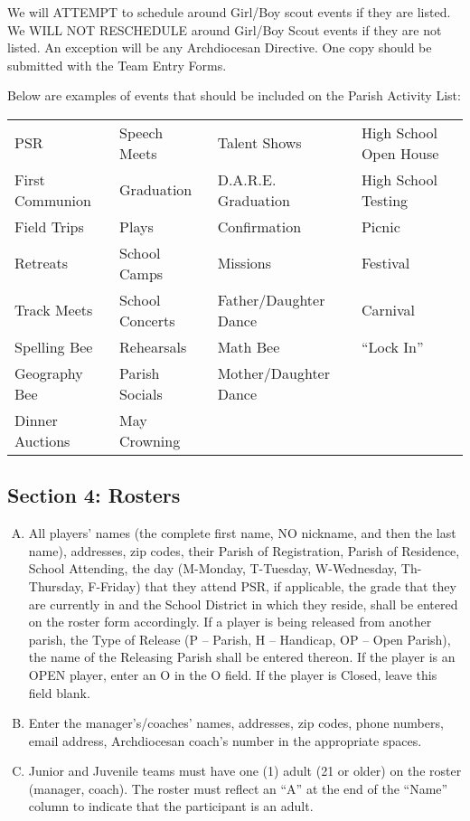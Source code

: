 We will ATTEMPT to schedule around Girl/Boy scout events if they are listed.  We WILL NOT RESCHEDULE around Girl/Boy Scout events if they are not listed.  An exception will be any Archdiocesan Directive. 
One copy should be submitted with the Team Entry Forms.

Below are examples of events that should be included on the Parish Activity List:

\begin{center}
    \begin{tabular}{>{\small}l >{\small}l >{\small}l >{\small}l}
        PSR & Speech Meets & Talent Shows & High School Open House \\
        First Communion & Graduation & D.A.R.E. Graduation & High School Testing \\
        Field Trips	& Plays & Confirmation & Picnic \\
        Retreats & School Camps & Missions & Festival \\
        Track Meets	& School Concerts & Father/Daughter Dance & Carnival \\
        Spelling Bee & Rehearsals & Math Bee & “Lock In” \\
        Geography Bee & Parish Socials & Mother/Daughter Dance	\\
        Dinner	Auctions & May Crowning & & \\
    \end{tabular}
\end{center}

\subsection{Section 4: Rosters}
\begin{enumerate}[A.]
    \item All players’ names (the complete first name, NO nickname, and then the last name), addresses, zip codes, their Parish of Registration, Parish of Residence, School Attending, the day (M-Monday, T-Tuesday, W-Wednesday, Th-Thursday, F-Friday) that they attend PSR, if applicable, the grade that they are currently in and the School District in which they reside, shall be entered on the roster form accordingly.  If a player is being released from another parish, the Type of Release (P – Parish, H – Handicap, OP – Open Parish), the name of the Releasing Parish shall be entered thereon.  If the player is an OPEN player, enter an O in the O field.  If the player is Closed, leave this field blank.
    \item Enter the manager’s/coaches’ names, addresses, zip codes, phone numbers, email address, Archdiocesan coach’s number in the appropriate spaces.
    \item Junior and Juvenile teams must have one (1) adult (21 or older) on the roster (manager, coach).  The roster must reflect an ``A'' at the end of the ``Name'' column to indicate that the participant is an adult.
\end{enumerate}

